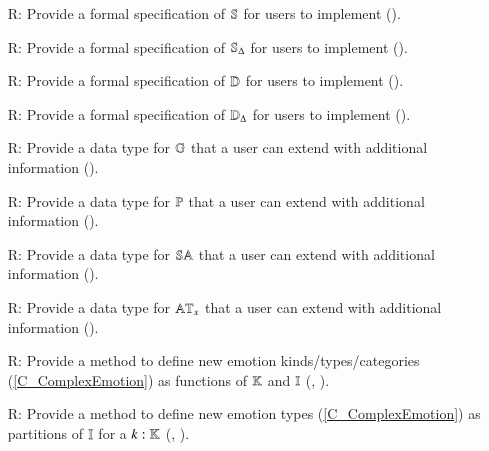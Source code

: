 \begin{itemize}
    \item[R\refstepcounter{reqnum}\thereqnum \label{R_WorldType}:] Provide a
    formal specification of $\mathbb{S}$ for users to implement
    ().

    \item[R\refstepcounter{reqnum}\thereqnum \label{R_WorldChangeType}:]
    Provide a formal specification of $\mathbb{S}_{\Delta}$ for users to
    implement ().

    \item[R\refstepcounter{reqnum}\thereqnum \label{R_DistanceType}:] Provide
    a formal specification of $\mathbb{D}$ for users to implement
    ().

    \item[R\refstepcounter{reqnum}\thereqnum \label{R_DistanceChangeType}:]
    Provide a formal specification of $\mathbb{D}_{\Delta}$ for users to
    implement ().

    \item[R\refstepcounter{reqnum}\thereqnum \label{R_GoalType}:] Provide a
    data type for $\mathbb{G}$ that a user can extend with additional
    information ().

    \item[R\refstepcounter{reqnum}\thereqnum \label{R_PlanType}:] Provide a
    data type for $\mathbb{P}$ that a user can extend with additional
    information ().

    \item[R\refstepcounter{reqnum}\thereqnum \label{R_SocialAttachment}:]
    Provide a data type for $\mathbb{SA}$ that a user can extend with
    additional information ().

    \item[R\refstepcounter{reqnum}\thereqnum \label{R_Attention}:] Provide a
    data type for $\mathbb{AT}_x$ that a user can extend with additional
    information ().

    \item[R\refstepcounter{reqnum}\thereqnum \label{R_MixingEmotionsPES}:]
    Provide a method to define new emotion kinds/types/categories
    (\cref{C_ComplexEmotion}) as functions of $\mathbb{K}$ and
    $\mathbb{I}$ (,
    ).

    \item[R\refstepcounter{reqnum}\thereqnum \label{R_PartitionEmotions}:]
    Provide a method to define new emotion types (\cref{C_ComplexEmotion}) as
    partitions of $\mathbb{I}$ for a $k : \mathbb{K}$
    (, ).


\end{itemize}
